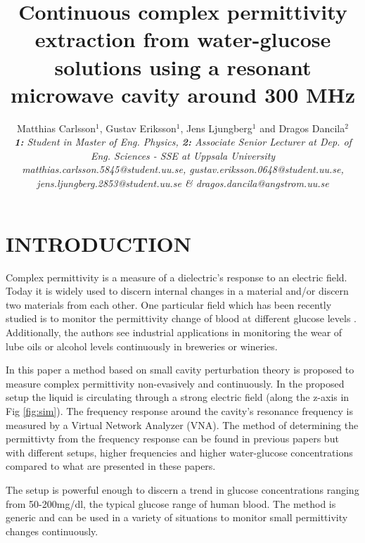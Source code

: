 \documentclass[10pt,final,conference,a4paper,twocolumn]{IEEEtran_AntennEMB_GigaHertz2016}
\begin{document}
\title{Continuous complex permittivity extraction from water-glucose solutions using a resonant microwave cavity around 300 MHz}

\author{Matthias Carlsson$^1$, Gustav Eriksson$^1$, Jens Ljungberg$^1$ and Dragos Dancila$^2$ \\
\em \small \textbf{1:} Student in Master of Eng. Physics, \textbf{2:} Associate Senior Lecturer at Dep. of Eng. Sciences - SSE at Uppsala University \\
\em \small matthias.carlsson.5845@student.uu.se, gustav.eriksson.0648@student.uu.se, \\
\em \small jens.ljungberg.2853@student.uu.se \& dragos.dancila@angstrom.uu.se
}

\maketitle
\section{INTRODUCTION}
 Complex permittivity is a measure of a dielectric's response to an electric field. Today it is widely used to discern internal changes in a material and/or discern two materials from each other. One particular field which has been recently studied is to monitor the permittivity change of blood at different glucose levels \cite{c2}. Additionally, the authors see industrial applications in monitoring the wear of lube oils or alcohol levels continuously in breweries or wineries.
 
 In this paper a method based on small cavity perturbation theory \cite{c3} is proposed to measure complex permittivity non-evasively and continuously. In the proposed setup the liquid is circulating through a strong electric field (along the z-axis in Fig \ref{fig:sim}). The frequency response around the cavity's resonance frequency is measured by a Virtual Network Analyzer (VNA). The method of determining the permittivty from the frequency response can be found in previous papers \cite{c2}\cite{c1} but with different setups, higher frequencies and higher water-glucose concentrations compared to what are presented in these papers.
 
 The setup is powerful enough to discern a trend in glucose concentrations ranging from 50-200mg/dl, the typical glucose range of human blood. The method is generic and can be used in a variety of situations to monitor small permittivity changes continuously.
\end{document}
